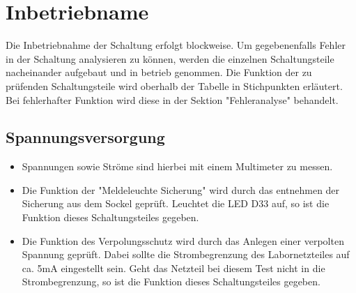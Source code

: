\documentclass[a4paper,11pt]{scrartcl}
\begin{document}
\section{Inbetriebname}


\begin{center}
Die Inbetriebnahme der Schaltung erfolgt blockweise. Um gegebenenfalls Fehler in der Schaltung analysieren zu können, werden die einzelnen Schaltungsteile nacheinander aufgebaut und in betrieb genommen. Die Funktion der zu prüfenden Schaltungsteile wird oberhalb der Tabelle in Stichpunkten erläutert. Bei fehlerhafter Funktion wird diese in der Sektion "Fehleranalyse" behandelt.
\end{center}



\subsection{Spannungsversorgung}


\begin{itemize}
	\item{Spannungen sowie Ströme sind hierbei mit einem Multimeter zu messen.}
	
	\item{Die Funktion der "Meldeleuchte Sicherung" wird durch das entnehmen der Sicherung aus dem Sockel geprüft. Leuchtet die LED D33 auf, so ist die Funktion dieses Schaltungsteiles gegeben.}
	
	\item{Die Funktion des Verpolungsschutz wird durch das Anlegen einer verpolten Spannung geprüft. Dabei sollte die Strombegrenzung des Labornetzteiles auf ca. 5mA eingestellt sein. Geht das Netzteil bei diesem Test nicht in die Strombegrenzung, so ist die Funktion dieses Schaltungsteiles gegeben.}
\end{itemize}

\end{document}

